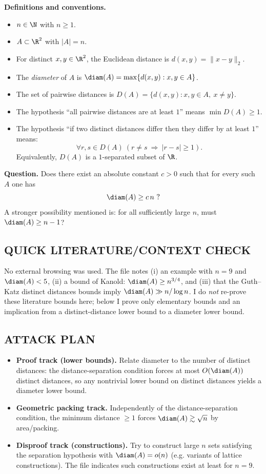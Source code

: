 \medskip
\noindent\textbf{Definitions and conventions.}
\begin{itemize}[leftmargin=2em]
\item $n\in\N$ with $n\ge 1$.
\item $A\subset\R^2$ with $|A|=n$.
\item For distinct $x,y\in\R^2$, the Euclidean distance is $d(x,y)=\|x-y\|_2$.
\item The \emph{diameter} of $A$ is $\diam(A)=\max\{d(x,y):x,y\in A\}$.
\item The set of pairwise distances is $D(A)=\{d(x,y):x,y\in A,\ x\ne y\}$.
\item The hypothesis ``all pairwise distances are at least $1$'' means $\min D(A)\ge 1$.
\item The hypothesis ``if two distinct distances differ then they differ by at least $1$'' means:
\[\forall r,s\in D(A)\ (r\ne s\ \Rightarrow\ |r-s|\ge 1).\]
Equivalently, $D(A)$ is a $1$-separated subset of $\R$.
\end{itemize}

\medskip
\noindent\textbf{Question.}
Does there exist an absolute constant $c>0$ such that for every such $A$ one has
\[\diam(A)\ge c\,n\ ?\]
A stronger possibility mentioned is: for all sufficiently large $n$, must $\diam(A)\ge n-1$?

\subsection*{QUICK LITERATURE/CONTEXT CHECK}
No external browsing was used.
The file notes (i) an example with $n=9$ and $\diam(A)<5$, (ii) a bound of Kanold: $\diam(A)\ge n^{3/4}$, and (iii) that the Guth--Katz distinct distances bounds imply $\diam(A)\gg n/\log n$.
I do \emph{not} re-prove these literature bounds here; below I prove only elementary bounds and an implication from a distinct-distance lower bound to a diameter lower bound.

\subsection*{ATTACK PLAN}
\begin{itemize}[leftmargin=2em]
\item \textbf{Proof track (lower bounds).} Relate diameter to the number of distinct distances: the distance-separation condition forces at most $O(\diam(A))$ distinct distances, so any nontrivial lower bound on distinct distances yields a diameter lower bound.
\item \textbf{Geometric packing track.} Independently of the distance-separation condition, the minimum distance $\ge 1$ forces $\diam(A)\gtrsim \sqrt{n}$ by area/packing.
\item \textbf{Disproof track (constructions).} Try to construct large $n$ sets satisfying the separation hypothesis with $\diam(A)=o(n)$ (e.g. variants of lattice constructions). The file indicates such constructions exist at least for $n=9$.
\end{itemize}

